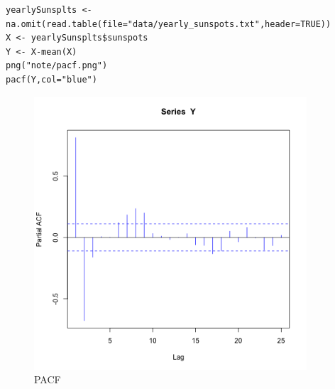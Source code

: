 \documentclass[11pt, oneside]{article}   	%
\begin{document}
 \begin{lstlisting}
yearlySunsplts <- na.omit(read.table(file="data/yearly_sunspots.txt",header=TRUE))
X <- yearlySunsplts$sunspots
Y <- X-mean(X)
png("note/pacf.png")
pacf(Y,col="blue")
 \end{lstlisting}
 

 \begin{figure}[H] %
    \centering
    \includegraphics[width=4in]{pacf.png} 
    \caption{PACF}
    \label{fig:pacf}
 \end{figure}

 
\end{document}
